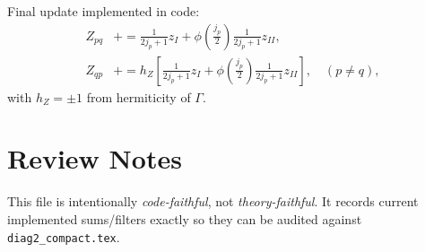 \documentclass{article}
\begin{document}
Final update implemented in code:
\begin{align}
Z_{pq} &\mathrel{+}= \frac{1}{2j_p+1}z_I + \phi\!\left(\frac{j_p}{2}\right)\frac{1}{2j_p+1}z_{II},\\
Z_{qp} &\mathrel{+}= h_Z\left[\frac{1}{2j_p+1}z_I + \phi\!\left(\frac{j_p}{2}\right)\frac{1}{2j_p+1}z_{II}\right],\quad (p\ne q),
\end{align}
with $h_Z=\pm 1$ from hermiticity of $\Gamma$.

\section*{Review Notes}
This file is intentionally \emph{code-faithful}, not \emph{theory-faithful}.
It records current implemented sums/filters exactly so they can be audited
against \texttt{diag2\_compact.tex}.
\end{document}
